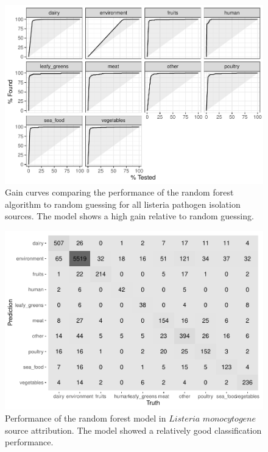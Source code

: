 \documentclass[
  10pt,
]{article}
\begin{document}
\begin{figure}[H]

{\centering \includegraphics{php2550_final_manuscript_files/figure-latex/fig-three-1} 

}

\caption{Gain curves comparing the performance of the random forest algorithm to random guessing for all listeria pathogen isolation sources. The model shows a high gain relative to random guessing.}\label{fig:fig-three}
\end{figure}

\begin{figure}[H]

{\centering \includegraphics{php2550_final_manuscript_files/figure-latex/figure-four-1} 

}

\caption{Performance of the random forest model in $\textit{Listeria monocytogene}$ source attribution. The model showed a relatively good classification performance.}\label{fig:figure-four}
\end{figure}
\end{document}
